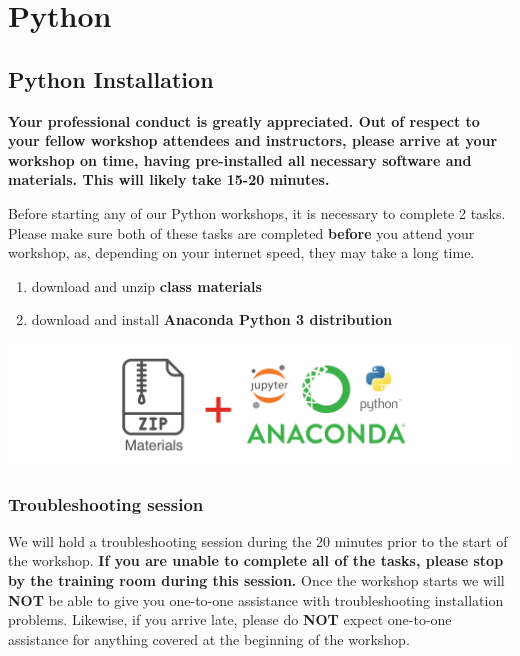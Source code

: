 \documentclass[]{book}
\providecommand{\tightlist}{%
  \setlength{\itemsep}{0pt}\setlength{\parskip}{0pt}}
\begin{document}
\hypertarget{part-python}{%
\part{Python}\label{part-python}}

\hypertarget{python-installation}{%
\chapter{Python Installation}\label{python-installation}}

\textbf{Your professional conduct is greatly appreciated. Out of respect to your fellow workshop attendees and instructors, please arrive at your workshop on time, having pre-installed all necessary software and materials. This will likely take 15-20 minutes.}

Before starting any of our Python workshops, it is necessary to complete 2 tasks. Please make sure both of these tasks are completed \textbf{before} you attend your workshop, as, depending on your internet speed, they may take a long time.

\begin{enumerate}
\def\labelenumi{\arabic{enumi}.}
\tightlist
\item
  download and unzip \textbf{class materials}
\item
  download and install \textbf{Anaconda Python 3 distribution}
\end{enumerate}

\includegraphics{Python/PythonInstall/images/install_software_Python.png}

\hypertarget{troubleshooting-session-1}{%
\section{Troubleshooting session}\label{troubleshooting-session-1}}

We will hold a troubleshooting session during the 20 minutes prior to the start of the workshop.
\textbf{If you are unable to complete all of the tasks, please stop by the training room during this session.}
Once the workshop starts we will \textbf{NOT} be able to give you one-to-one assistance with troubleshooting installation problems. Likewise, if you arrive late, please do \textbf{NOT} expect one-to-one assistance for anything covered at the beginning of the workshop.
\end{document}
